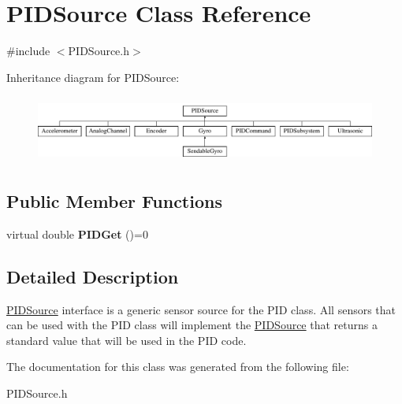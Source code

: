 \hypertarget{classPIDSource}{
\section{PIDSource Class Reference}
\label{classPIDSource}
}


{\ttfamily \#include $<$PIDSource.h$>$}

Inheritance diagram for PIDSource:\begin{figure}[H]
\begin{center}
\leavevmode
\includegraphics[height=2.242991cm]{classPIDSource}
\end{center}
\end{figure}
\subsection*{Public Member Functions}
\begin{DoxyCompactItemize}
\item 
\hypertarget{classPIDSource_adbec8669a824cab3b0b59a7fa1bae6f0}{
virtual double {\bfseries PIDGet} ()=0}
\label{classPIDSource_adbec8669a824cab3b0b59a7fa1bae6f0}

\end{DoxyCompactItemize}


\subsection{Detailed Description}
\hyperlink{classPIDSource}{PIDSource} interface is a generic sensor source for the PID class. All sensors that can be used with the PID class will implement the \hyperlink{classPIDSource}{PIDSource} that returns a standard value that will be used in the PID code. 

The documentation for this class was generated from the following file:\begin{DoxyCompactItemize}
\item 
PIDSource.h\end{DoxyCompactItemize}
